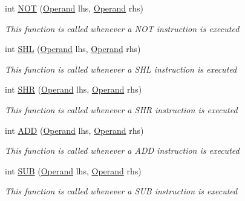 \begin{DoxyCompactItemize}
int \hyperlink{class_c_p_u___o_s___simulator_1_1_c_p_u_1_1_instruction_ab639a616b188c9816dd1775ebda837d4}{N\+O\+T} (\hyperlink{class_c_p_u___o_s___simulator_1_1_c_p_u_1_1_operand}{Operand} lhs, \hyperlink{class_c_p_u___o_s___simulator_1_1_c_p_u_1_1_operand}{Operand} rhs)
\begin{DoxyCompactList}\small\item\em This function is called whenever a N\+O\+T instruction is executed \end{DoxyCompactList}\item 
int \hyperlink{class_c_p_u___o_s___simulator_1_1_c_p_u_1_1_instruction_ad5e8679e646e772e6fb2d7655bad9f6f}{S\+H\+L} (\hyperlink{class_c_p_u___o_s___simulator_1_1_c_p_u_1_1_operand}{Operand} lhs, \hyperlink{class_c_p_u___o_s___simulator_1_1_c_p_u_1_1_operand}{Operand} rhs)
\begin{DoxyCompactList}\small\item\em This function is called whenever a S\+H\+L instruction is executed \end{DoxyCompactList}\item 
int \hyperlink{class_c_p_u___o_s___simulator_1_1_c_p_u_1_1_instruction_a5796880f8494dab4070d151f3e4b2301}{S\+H\+R} (\hyperlink{class_c_p_u___o_s___simulator_1_1_c_p_u_1_1_operand}{Operand} lhs, \hyperlink{class_c_p_u___o_s___simulator_1_1_c_p_u_1_1_operand}{Operand} rhs)
\begin{DoxyCompactList}\small\item\em This function is called whenever a S\+H\+R instruction is executed \end{DoxyCompactList}\item 
int \hyperlink{class_c_p_u___o_s___simulator_1_1_c_p_u_1_1_instruction_a0c627b3cf43f2bf9d196800fbc7dc476}{A\+D\+D} (\hyperlink{class_c_p_u___o_s___simulator_1_1_c_p_u_1_1_operand}{Operand} lhs, \hyperlink{class_c_p_u___o_s___simulator_1_1_c_p_u_1_1_operand}{Operand} rhs)
\begin{DoxyCompactList}\small\item\em This function is called whenever a A\+D\+D instruction is executed \end{DoxyCompactList}\item 
int \hyperlink{class_c_p_u___o_s___simulator_1_1_c_p_u_1_1_instruction_a24caa7b8d57d9fa4e839b45ce2b2816e}{S\+U\+B} (\hyperlink{class_c_p_u___o_s___simulator_1_1_c_p_u_1_1_operand}{Operand} lhs, \hyperlink{class_c_p_u___o_s___simulator_1_1_c_p_u_1_1_operand}{Operand} rhs)
\begin{DoxyCompactList}\small\item\em This function is called whenever a S\+U\+B instruction is executed \end{DoxyCompactList}\item 

\end{DoxyCompactItemize}
